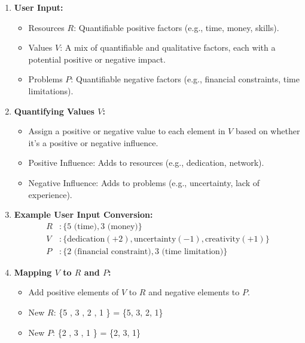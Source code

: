 \documentclass{article}
\begin{document}
\begin{enumerate}
  \item \textbf{User Input:}
  \begin{itemize}
    \item Resources \( R \): Quantifiable positive factors (e.g., time, money, skills).
    \item Values \( V \): A mix of quantifiable and qualitative factors, each with a potential positive or negative impact.
    \item Problems \( P \): Quantifiable negative factors (e.g., financial constraints, time limitations).
  \end{itemize}

  \item \textbf{Quantifying Values \( V \):}
  \begin{itemize}
    \item Assign a positive or negative value to each element in \( V \) based on whether it’s a positive or negative influence.
    \item Positive Influence: Adds to resources (e.g., dedication, network).
    \item Negative Influence: Adds to problems (e.g., uncertainty, lack of experience).
  \end{itemize}

  \item \textbf{Example User Input Conversion:}
  \begin{align*}
    R &: \{5 \text{ (time)}, 3 \text{ (money)}\} \\
    V &: \{\text{dedication} (+2), \text{uncertainty} (-1), \text{creativity} (+1)\} \\
    P &: \{2 \text{ (financial constraint)}, 3 \text{ (time limitation)}\}
  \end{align*}

  \item \textbf{Mapping \( V \) to \( R \) and \( P \):}
  \begin{itemize}
    \item Add positive elements of \( V \) to \( R \) and negative elements to \( P \).
    \item New \( R \): \{5 , 3 , 2 , 1 \} = \{5, 3, 2, 1\}
    \item New \( P \): \{2 , 3 , 1 \} = \{2, 3, 1\}
  \end{itemize}


\end{enumerate}
\end{document}
